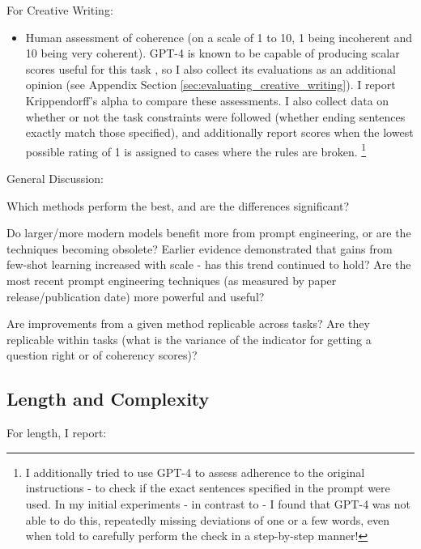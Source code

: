 \documentclass[11pt]{article}
\begin{document}
For Creative Writing:
\begin{itemize}
  \item Human assessment of coherence (on a scale of 1 to 10, 1 being incoherent and 10 being very coherent). GPT-4 is known to be capable of producing scalar scores useful for this task \cite{yao_tree_2023}, so I also collect its evaluations as an additional opinion (see Appendix Section \ref{sec:evaluating_creative_writing}). I report Krippendorff's alpha to compare these assessments. I also collect data on whether or not the task constraints were followed (whether ending sentences exactly match those specified), and additionally report scores when the lowest possible rating of 1 is assigned to cases where the rules are broken. \footnote{I additionally tried to use GPT-4 to assess adherence to the original instructions - to check if the exact sentences specified in the prompt were used. In my initial experiments - in contrast to \citealp{yao_tree_2023} - I found that GPT-4 was not able to do this, repeatedly missing deviations of one or a few words, even when told to carefully perform the check in a step-by-step manner!}
\end{itemize}

General Discussion:

Which methods perform the best, and are the differences significant?

Do larger/more modern models benefit more from prompt engineering, or are the techniques becoming obsolete? Earlier evidence demonstrated that gains from few-shot learning increased with scale - has this trend continued to hold? \cite{brown_language_2020} Are the most recent prompt engineering techniques (as measured by paper release/publication date) more powerful and useful?

Are improvements from a given method replicable across tasks? Are they replicable within tasks (what is the variance of the indicator for getting a question right or of coherency scores)?

\subsection*{Length and Complexity}

For length, I report:
\end{document}
